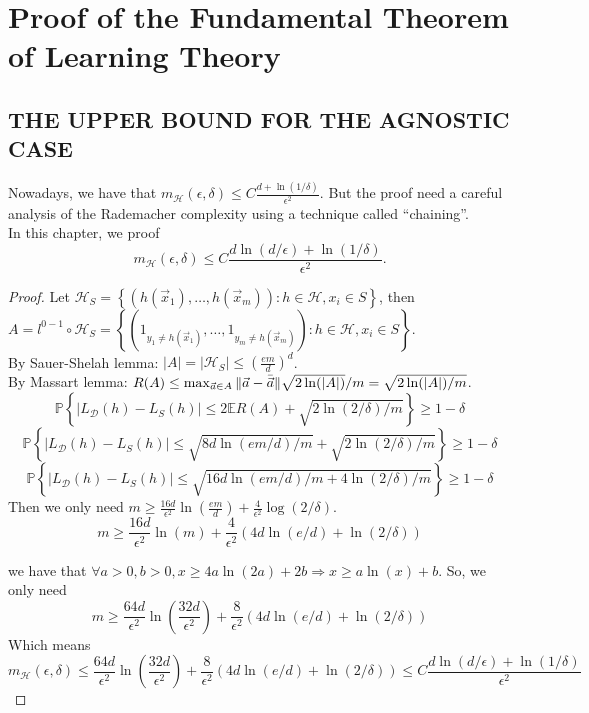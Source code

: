 
\section{Proof of the Fundamental Theorem of Learning Theory}%
\label{sec:proof_of_the_fundamental_theorem_of_learning_theory}

\subsection{THE UPPER BOUND FOR THE AGNOSTIC CASE}%

Nowadays, we have that $ m_\mathcal{H}(\epsilon, \delta) \le C \frac{d + \ln(1/\delta)}{\epsilon^2} $.
But the proof need a careful analysis of the Rademacher complexity using a technique called ``chaining''.\\
In this chapter, we proof
\[
    m_\mathcal{H}(\epsilon, \delta) \le C \frac{d\ln(d/\epsilon) + \ln(1/\delta)}{\epsilon^2}.
\]

\begin{proof}
    Let $ \mathcal{H}_S = \left\{ (h(\vec{x}_1), \ldots, h(\vec{x}_m)): h \in \mathcal{H}, x_i \in S \right\} $, then
    $ A = l^{0-1} \circ \mathcal{H}_S = \left\{ ( 1_{ y_1 \ne h(\vec{x}_1)}, \ldots, 1_{y_m \ne h(\vec{x}_m)}): h \in \mathcal{H}, x_i \in S \right\} $.\\
    By Sauer-Shelah lemma: $ |A| = |\mathcal{H}_S| \le {\left( \frac{em}{d}  \right)}^d $.\\
    By Massart lemma: $ R(A) \le \max_{\vec{a} \in A} \Arrowvert \vec{a} - \bar{\vec a} \Arrowvert \sqrt{2 \ln( |A| )} / m = \sqrt{2 \ln(|A|) / m} $.
    \[
        \mathbb{P} \left\{  |L_\mathcal{D}(h) - L_S(h) | \le 2\mathbb{E} R(A) + \sqrt{2 \ln(2/\delta) / m} \right\} \ge 1- \delta
    \]
    \[
        \mathbb{P} \left\{  |L_\mathcal{D}(h) - L_S(h) | \le \sqrt{{8d \ln(em/d)}/{m}}+ \sqrt{2 \ln(2/\delta) / m} \right\} \ge 1- \delta
    \]
    \[
        \mathbb{P} \left\{  |L_\mathcal{D}(h) - L_S(h) | \le \sqrt{{16d \ln(em/d)}/{m} + 4 \ln(2/\delta) / m} \right\} \ge 1- \delta
    \]
    Then we only need $ m \ge \frac{16d}{\epsilon^2} \ln\left( \frac{em}{d} \right) + \frac{4}{\epsilon^2} \log(2/\delta) $.
    \[
        m \ge \frac{16d}{\epsilon^2} \ln (m) + \frac{4}{\epsilon^2} \left( 4d \ln(e/d) + \ln(2/\delta) \right)
    \]
    
    we have that $ \forall a > 0, b > 0, x \ge 4a \ln(2a) + 2b \Rightarrow x \ge a \ln(x) +b $.
    So, we only need
    \[
        m \ge \frac{64d}{\epsilon^2} \ln \left( \frac{32d}{\epsilon^2} \right) + \frac{8}{\epsilon^2} \left( 4d \ln(e/d) + \ln(2/\delta) \right)
    \]
    Which means
    \[
        m_\mathcal{H}(\epsilon, \delta) \le \frac{64d}{\epsilon^2} \ln \left( \frac{32d}{\epsilon^2} \right) + \frac{8}{\epsilon^2} \left( 4d \ln(e/d) + \ln(2/\delta) \right) \le C \frac{d\ln(d/\epsilon) + \ln(1/\delta)}{\epsilon^2} 
    \]
\end{proof}

